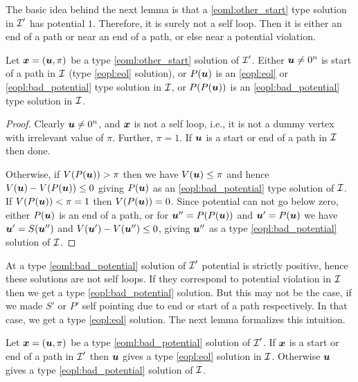 The basic idea behind the next lemma is that a \ref{eoml:other_start} type solution in $\mbox{${\mathcal I}$}'$ has
potential $1$. Therefore, it is surely not a self loop. Then it is either an end of a path or near an end of a path, or else near a potential violation. 

\begin{lemma}\label{lem:p2m-t2}
Let $\mbox{\boldmath $x$}=(\mbox{\boldmath $u$},\pi)$ be a type \ref{eoml:other_start} solution of $\mbox{${\mathcal I}$}'$. Either $\mbox{\boldmath $u$} \neq 0^n$ is start of a path in $\mbox{${\mathcal I}$}$ (type \ref{eopl:eol} solution), or $P(\mbox{\boldmath $u$})$ is an \ref{eopl:eol} or \ref{eopl:bad_potential} type solution in $\mbox{${\mathcal I}$}$, or $P(P(\mbox{\boldmath $u$}))$ is an \ref{eopl:bad_potential} type solution in $\mbox{${\mathcal I}$}$.
\end{lemma}

\begin{proof}
Clearly $\mbox{\boldmath $u$} \neq 0^n$, and $\mbox{\boldmath $x$}$ is not a self loop, i.e., it is not a dummy vertex with irrelevant value of $\pi$. Further, $\pi=1$. If $\mbox{\boldmath $u$}$ is a start or end of a path in $\mbox{${\mathcal I}$}$ then done. 

Otherwise, if $V(P(\mbox{\boldmath $u$}))>\pi$ then we have $V(\mbox{\boldmath $u$})\le \pi$ and hence $V(\mbox{\boldmath $u$})-V(P(\mbox{\boldmath $u$}))\le 0$ giving $P(\mbox{\boldmath $u$})$ as an \ref{eopl:bad_potential} type solution of $\mbox{${\mathcal I}$}$. 
If $V(P(\mbox{\boldmath $u$}))<\pi=1$ then $V(P(\mbox{\boldmath $u$}))=0$. Since potential can not go below zero, either $P(\mbox{\boldmath $u$})$ is an end of a path, or for $\mbox{\boldmath $u$}''=P(P(\mbox{\boldmath $u$}))$ and $\mbox{\boldmath $u$}'=P(\mbox{\boldmath $u$})$ we have $\mbox{\boldmath $u$}'=S(\mbox{\boldmath $u$}'')$ and $V(\mbox{\boldmath $u$}')-V(\mbox{\boldmath $u$}'')\le 0$, giving $\mbox{\boldmath $u$}''$ as a type \ref{eopl:bad_potential} solution of $\mbox{${\mathcal I}$}$.
\end{proof}

At a type \ref{eoml:bad_potential} solution of $\mbox{${\mathcal I}$}'$ potential is strictly positive, hence these solutions are not self loops. If they correspond to potential violation in $\mbox{${\mathcal I}$}$ then we get a type \ref{eopl:bad_potential} solution. But this may not be the case, if we made $S'$ or $P'$ self pointing due to end or start of a path respectively. In that case, we get a type \ref{eopl:eol} solution. The next lemma formalizes this intuition. 

\begin{lemma}\label{lem:p2m-t3}
Let $\mbox{\boldmath $x$}=(\mbox{\boldmath $u$},\pi)$ be a type \ref{eoml:bad_potential} solution of $\mbox{${\mathcal I}$}'$. If $\mbox{\boldmath $x$}$ is a start or end of a path in $\mbox{${\mathcal I}$}'$ then $\mbox{\boldmath $u$}$ gives a type \ref{eopl:eol} solution in $\mbox{${\mathcal I}$}$. Otherwise $\mbox{\boldmath $u$}$ gives a type \ref{eopl:bad_potential} solution of $\mbox{${\mathcal I}$}$.
\end{lemma}

